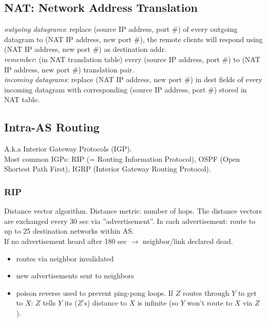 \documentclass[10pt, a4paper, twocolumn]{scrartcl}
\begin{document}
\subsection{NAT: Network Address Translation}

\textit{outgoing datagrams}: replace (source IP address, port \#) of every outgoing datagram to (NAT IP address, new port \#), the remote clients will respond using (NAT IP address, new port \#) as destination addr.\\

\textit{remember}: (in NAT translation table) every (source IP address, port \#) to (NAT IP address, new port \#) translation pair.\\

\textit{incoming datagrams}: replace (NAT IP address, new port \#) in dest fields of every incoming datagram with corresponding (source IP address, port \#) stored in NAT table.

\subsection{Intra-AS Routing}

A.k.a Interior Gateway Protocols (IGP).\\

Most common IGPs: RIP (= Routing Information Protocol), OSPF (Open Shortest Path First), IGRP (Interior Gateway Routing Protocol).

\subsubsection{RIP}

Distance vector algorithm. Distance metric: number of hops. The distance vectors are exchanged every 30 sec via ''advertisement''. In each advertisement: route to up to 25 destination networks within AS.\\

If no advertisement heard after 180 sec $\rightarrow$ neighbor/link declared dead.
\begin{itemize}
	\item routes via neighbor invalidated
	\item new advertisements sent to neighbors
	\item poison reverse used to prevent ping-pong loops. If $Z$ routes through $Y$ to get to $X$: $Z$ tells $Y$ its ($Z$'s) distance to $X$ is infinite (so $Y$ won't route to $X$ via $Z$).
\end{itemize}
\end{document}
